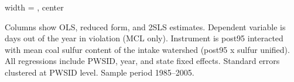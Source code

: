 \begin{table}[htbp]
\begin{adjustbox}{width = \textwidth, center}
      
      
   \end{adjustbox}
      {\tiny\linespread{1}\selectfont \par \raggedright 
   Columns show OLS, reduced form, and 2SLS estimates. Dependent variable is days out of the year in violation (MCL only). Instrument is post95 interacted with mean coal sulfur content of the intake watershed (post95 x sulfur unified). All regressions include PWSID, year, and state fixed effects. Standard errors clustered at PWSID level. Sample period 1985--2005.}
   
\end{table}


